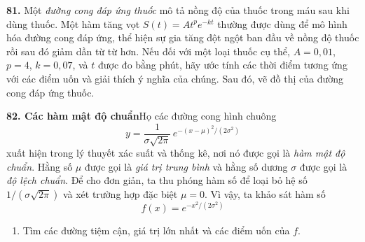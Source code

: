 \begin{minipage}[t]{0.485\textwidth}
\vspace{0.5mm}
\noindent\makebox[0pt][r]{\casicon\hspace{4pt}}\textbf{81.} Một \textit{đường cong đáp ứng thuốc} mô tả nồng độ của thuốc trong máu sau khi dùng thuốc. Một hàm tăng vọt $S(t) = At^p e^{-kt}$ thường được dùng để mô hình hóa đường cong đáp ứng, thể hiện sự gia tăng đột ngột ban đầu về nồng độ thuốc rồi sau đó giảm dần từ từ hơn. Nếu đối với một loại thuốc cụ thể, $A = 0{,}01$, $p = 4$, $k = 0{,}07$, và $t$ được đo bằng phút, hãy ước tính các thời điểm tương ứng với các điểm uốn và giải thích ý nghĩa của chúng. Sau đó, vẽ đồ thị của đường cong đáp ứng thuốc.

\vspace{2mm}
\textbf{82. Các hàm mật độ chuẩn}\quad Họ các đường cong hình chuông
\[
y = \frac{1}{\sigma \sqrt{2\pi}}\, e^{-(x-\mu)^2/(2\sigma^2)}
\]
xuất hiện trong lý thuyết xác suất và thống kê, nơi nó được gọi là \textit{hàm mật độ chuẩn}. Hằng số $\mu$ được gọi là \textit{giá trị trung bình} và hằng số dương $\sigma$ được gọi là \textit{độ lệch chuẩn}. Để cho đơn giản, ta thu phóng hàm số để loại bỏ hệ số $1/(\sigma \sqrt{2\pi})$ và xét trường hợp đặc biệt $\mu = 0$. Vì vậy, ta khảo sát hàm số
\[
f(x) = e^{-x^2/(2\sigma^2)}
\]
\begin{enumerate}[label=(\alph*), itemsep=0.5pt, topsep=1.5pt, parsep=0pt, leftmargin=1.5em]
    \item Tìm các đường tiệm cận, giá trị lớn nhất và các điểm uốn của $f$.
\end{enumerate}
\end{minipage}%
\hfill
